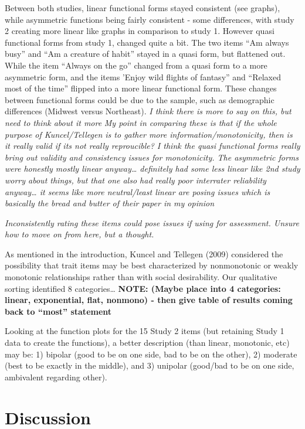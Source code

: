 \documentclass[
  ,jou]{apa6}
\begin{document}
Between both studies, linear functional forms stayed consistent (see graphs), while asymmetric functions being fairly consistent - some differences, with study 2 creating more linear like graphs in comparison to study 1. However quasi functional forms from study 1, changed quite a bit. The two items ``Am always busy'' and ``Am a creature of habit'' stayed in a quasi form, but flattened out. While the item ``Always on the go'' changed from a quasi form to a more asymmetric form, and the items 'Enjoy wild flights of fantasy'' and ``Relaxed most of the time'' flipped into a more linear functional form. These changes between functional forms could be due to the sample, such as demographic differences (Midwest versus Northeast). \emph{I think there is more to say on this, but need to think about it more} \emph{My point in comparing these is that if the whole purpose of Kuncel/Tellegen is to gather more information/monotonicity, then is it really valid if its not really reproucible? I think the quasi functional forms really bring out validity and consistency issues for monotonicity. The asymmetric forms were honestly mostly linear anyway\ldots{} definitely had some less linear like 2nd study worry about things, but that one also had really poor interrater reliability anyway\ldots{} it seems like more neutral/least linear are posing issues which is basically the bread and butter of their paper in my opinion}

\emph{Inconsistently rating these items could pose issues if using for assessment. Unsure how to move on from here, but a thought.}

As mentioned in the introduction, Kuncel and Tellegen (2009) considered the possibility that trait items may be best characterized by nonmonotonic or weakly monotonic relationships rather than with social desirability. Our qualitative sorting identified 8 categories\ldots{} \textbf{NOTE: (Maybe place into 4 categories: linear, exponential, flat, nonmono) - then give table of results coming back to ``most'' statement}

Looking at the function plots for the 15 Study 2 items (but retaining Study 1 data to create the functions), a better description (than linear, monotonic, etc) may be: 1) bipolar (good to be on one side, bad to be on the other), 2) moderate (best to be exactly in the middle), and 3) unipolar (good/bad to be on one side, ambivalent regarding other).

\hypertarget{discussion}{%
\section{Discussion}\label{discussion}}
\end{document}
